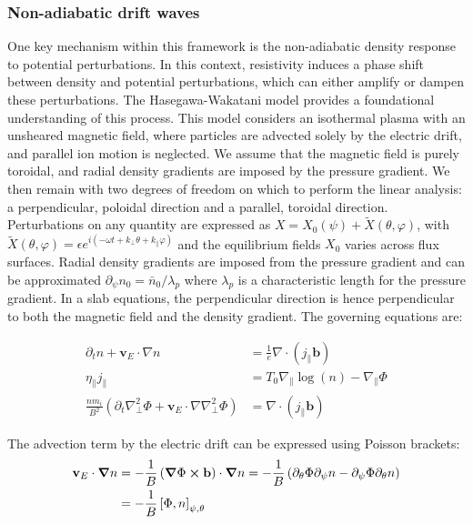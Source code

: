 \subsubsection{Non-adiabatic drift waves}
\label{ssec:edge_nonAdiabaticResponse}
One key mechanism within this framework is the non-adiabatic density response to potential perturbations. In this context, resistivity induces a phase shift between density and potential perturbations, which can either amplify or dampen these perturbations. The Hasegawa-Wakatani model \cite{hasegawa1983plasma} provides a foundational understanding of this process. This model considers an isothermal plasma with an unsheared magnetic field, where particles are advected solely by the electric drift, and parallel ion motion is neglected. We assume that the magnetic field is purely toroidal, and radial density gradients are imposed by the pressure gradient. We then remain with two degrees of freedom on which to perform the linear analysis: a perpendicular, poloidal direction and a parallel, toroidal direction. Perturbations on any quantity are expressed as $ X = X_0(\psi) + \tilde{X}(\theta,\varphi) $, with $\tilde{X}(\theta,\varphi) = \epsilon e^{i(-\omega t + k_\perp\theta+k_\parallel\varphi )}$ and the equilibrium fields $ X_0 $ varies across flux surfaces. Radial density gradients are imposed from the pressure gradient and can be approximated $\partial_\psi n_0 = \bar{n}_0 / \lambda_p$ where $\lambda_p$ is a characteristic length for the pressure gradient. In a slab equations, the perpendicular direction is hence perpendicular to both the magnetic field and the density gradient. The governing equations are:

\begin{align}
	\partial_t n + \mathbf{v}_E \cdot \nabla n &= \frac{1}{e} \nabla \cdot (j_\parallel \mathbf{b}) \\
	\eta_\parallel j_\parallel &= T_0 \nabla_\parallel \log(n) - \nabla_\parallel \Phi \\
	\frac{nm_i}{B^2} \left(\partial_t \nabla_\perp^2 \Phi + \mathbf{v}_E \cdot \nabla \nabla_\perp^2 \Phi\right) &= \nabla \cdot (j_\parallel \mathbf{b})
\end{align}

The advection term by the electric drift can be expressed using Poisson brackets:
\begin{align}
	\mathbf{v}_E\cdot\grad n &= -\frac{1}{B}\left(\grad\Phi\cross \mathbf{b} \right)\cdot\grad n = -\frac{1}{B} \left(\partial_\theta\Phi \partial_\psi n - \partial_\psi\Phi \partial_\theta n\right) \nonumber \\ 
	&= -\frac{1}{B}\left[\Phi,n\right]_{\psi,\theta} \label{eq:edge_poissonBracket}
\end{align}

